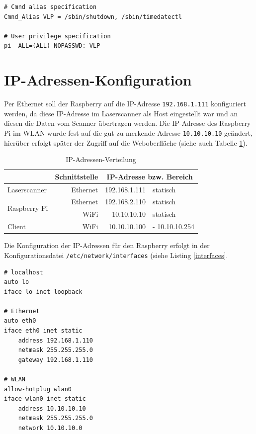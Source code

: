 \documentclass[a4paper,12pt,bibliography=totoc, listof=totoc,titlepage]{scrreprt}
\newcommand{\code}[1]{\texttt{#1}}
\begin{document}
\begin{lstlisting}[caption={Änderung der \code{/etc/sudoers}}, label={Lsudoers}]
# Cmnd alias specification
Cmnd_Alias VLP = /sbin/shutdown, /sbin/timedatectl

# User privilege specification
pi	ALL=(ALL) NOPASSWD: VLP
\end{lstlisting}

\section{IP-Adressen-Konfiguration}
Per Ethernet soll der Raspberry auf die IP-Adresse \code{192.168.1.111} konfiguriert werden, da diese IP-Adresse im Laserscanner als Host eingestellt war und an diesen die Daten vom Scanner übertragen werden. Die IP-Adresse des Raspberry Pi im WLAN wurde fest auf die gut zu merkende Adresse \code{10.10.10.10} geändert, hierüber erfolgt später der Zugriff auf die Weboberfläche (siehe auch Tabelle \ref{ipAdressen}).

\begin{table}[]
\centering
\begin{tabular}{l|r|r|l|}
\cline{2-4}
                                                    & Schnittstelle & \multicolumn{2}{c|}{IP-Adresse bzw. Bereich} \\ \hline
\multicolumn{1}{|l|}{Laserscanner}                  & Ethernet      & 192.168.1.111        & statisch              \\ \hline
\multicolumn{1}{|l|}{\multirow{2}{*}{Raspberry Pi}} & Ethernet      & 192.168.2.110        & statisch              \\ \cline{2-4} 
\multicolumn{1}{|l|}{}                              & WiFi          & 10.10.10.10          & statisch              \\ \hline
\multicolumn{1}{|l|}{Client}                        & WiFi          & 10.10.10.100         & - 10.10.10.254        \\ \hline
\end{tabular}
\caption{IP-Adressen-Verteilung}
\label{ipAdressen}
\end{table}

Die Konfiguration der IP-Adressen für den Raspberry erfolgt in der Konfigurationsdatei \code{/etc/network/interfaces} (siehe Listing \ref{interfaces}. \cite{accesspoint}

\begin{lstlisting}[caption={Konfiguration der \code{/etc/network/interfaces}}, label={interfaces}]
# localhost
auto lo
iface lo inet loopback

# Ethernet
auto eth0
iface eth0 inet static
	address 192.168.1.110
	netmask 255.255.255.0
	gateway 192.168.1.110

# WLAN
allow-hotplug wlan0
iface wlan0 inet static
	address 10.10.10.10
	netmask 255.255.255.0
	network 10.10.10.0
\end{lstlisting}
\end{document}
